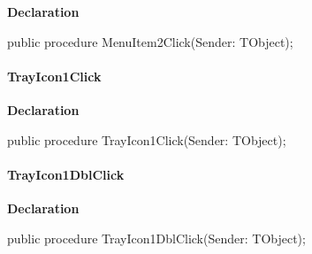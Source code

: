 \documentclass{report}
\newif\ifpdf
\begin{document}
\label{mnupdate.TForm1-MenuItem2Click}
\begin{list}{}{
\setlength{\itemindent}{0cm}
\setlength{\listparindent}{0cm}
\setlength{\leftmargin}{\evensidemargin}
\addtolength{\leftmargin}{\tmplength}
\settowidth{\labelsep}{X}
\addtolength{\leftmargin}{\labelsep}
\setlength{\labelwidth}{\tmplength}
}
\item[\textbf{Declaration}\hfill]
\ifpdf
\begin{flushleft}
\fi
\begin{ttfamily}
public procedure MenuItem2Click(Sender: TObject);\end{ttfamily}

\ifpdf
\end{flushleft}
\fi

\end{list}
\paragraph*{TrayIcon1Click}\hspace*{\fill}

\label{mnupdate.TForm1-TrayIcon1Click}
\begin{list}{}{
\setlength{\itemindent}{0cm}
\setlength{\listparindent}{0cm}
\setlength{\leftmargin}{\evensidemargin}
\addtolength{\leftmargin}{\tmplength}
\settowidth{\labelsep}{X}
\addtolength{\leftmargin}{\labelsep}
\setlength{\labelwidth}{\tmplength}
}
\item[\textbf{Declaration}\hfill]
\ifpdf
\begin{flushleft}
\fi
\begin{ttfamily}
public procedure TrayIcon1Click(Sender: TObject);\end{ttfamily}

\ifpdf
\end{flushleft}
\fi

\end{list}
\paragraph*{TrayIcon1DblClick}\hspace*{\fill}

\label{mnupdate.TForm1-TrayIcon1DblClick}
\begin{list}{}{
\setlength{\itemindent}{0cm}
\setlength{\listparindent}{0cm}
\setlength{\leftmargin}{\evensidemargin}
\addtolength{\leftmargin}{\tmplength}
\settowidth{\labelsep}{X}
\addtolength{\leftmargin}{\labelsep}
\setlength{\labelwidth}{\tmplength}
}
\item[\textbf{Declaration}\hfill]
\ifpdf
\begin{flushleft}
\fi
\begin{ttfamily}
public procedure TrayIcon1DblClick(Sender: TObject);\end{ttfamily}

\ifpdf
\end{flushleft}
\fi

\end{list}
\end{document}
